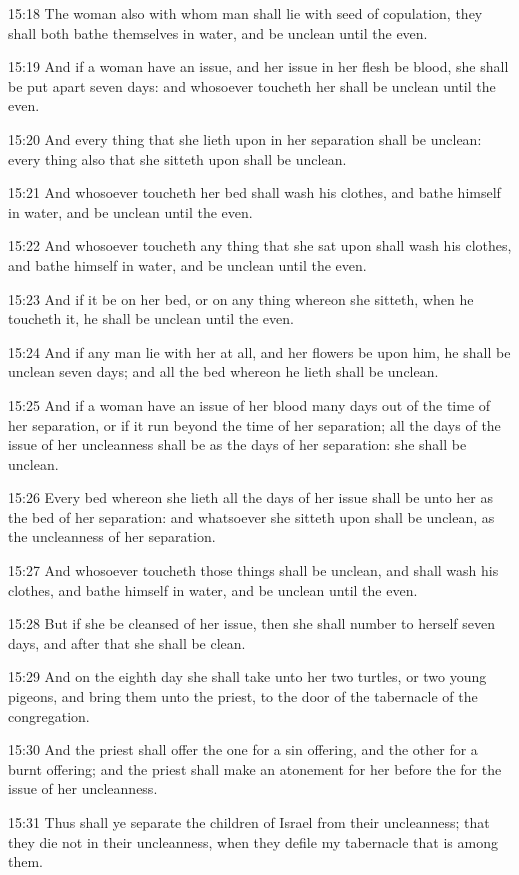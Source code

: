 15:18 The woman also with whom man shall lie with seed of copulation,
they shall both bathe themselves in water, and be unclean until the
even.

15:19 And if a woman have an issue, and her issue in her flesh be
blood, she shall be put apart seven days: and whosoever toucheth her
shall be unclean until the even.

15:20 And every thing that she lieth upon in her separation shall be
unclean: every thing also that she sitteth upon shall be unclean.

15:21 And whosoever toucheth her bed shall wash his clothes, and bathe
himself in water, and be unclean until the even.

15:22 And whosoever toucheth any thing that she sat upon shall wash
his clothes, and bathe himself in water, and be unclean until the
even.

15:23 And if it be on her bed, or on any thing whereon she sitteth,
when he toucheth it, he shall be unclean until the even.

15:24 And if any man lie with her at all, and her flowers be upon him,
he shall be unclean seven days; and all the bed whereon he lieth shall
be unclean.

15:25 And if a woman have an issue of her blood many days out of the
time of her separation, or if it run beyond the time of her
separation; all the days of the issue of her uncleanness shall be as
the days of her separation: she shall be unclean.

15:26 Every bed whereon she lieth all the days of her issue shall be
unto her as the bed of her separation: and whatsoever she sitteth upon
shall be unclean, as the uncleanness of her separation.

15:27 And whosoever toucheth those things shall be unclean, and shall
wash his clothes, and bathe himself in water, and be unclean until the
even.

15:28 But if she be cleansed of her issue, then she shall number to
herself seven days, and after that she shall be clean.

15:29 And on the eighth day she shall take unto her two turtles, or
two young pigeons, and bring them unto the priest, to the door of the
tabernacle of the congregation.

15:30 And the priest shall offer the one for a sin offering, and the
other for a burnt offering; and the priest shall make an atonement for
her before the \LORD for the issue of her uncleanness.

15:31 Thus shall ye separate the children of Israel from their
uncleanness; that they die not in their uncleanness, when they defile
my tabernacle that is among them.

